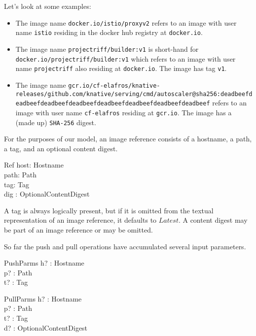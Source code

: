 \documentclass[a4paper,twoside,12pt]{article}
\begin{document}
Let's look at some examples:
\begin{itemize}
\item The image name \texttt{docker.io/istio/proxyv2} refers to an image with user name \texttt{istio} residing in the docker hub registry at \texttt{docker.io}.

\item The image name \texttt{projectriff/builder:v1} is short-hand for\linebreak
\texttt{docker.io/projectriff/builder:v1} which refers to an image with user name \texttt{projectriff} also residing at \texttt{docker.io}. The image has tag \texttt{v1}.

\item The image name \texttt{gcr.io/cf-elafros/knative-releases/github.com}\linebreak\texttt{/knative/serving/cmd/autoscaler@sha256:deadbeefdeadbeef}\linebreak\texttt{deadbeefdeadbeefdeadbeefdeadbeefdeadbeefdeadbeef} refers to an image with user name \texttt{cf-elafros} residing at \texttt{gcr.io}. The image has a (made up) \texttt{SHA-256} digest.
\end{itemize}

For the purposes of our model, an image reference consists of a hostname, a path, a tag, and an optional content digest.
\begin{schema}{Ref}
    host: Hostname \\
    path: Path \\
    tag: Tag \\
    dig : OptionalContentDigest \\
\end{schema}
A tag is always logically present, but if it is omitted from the textual representation of an image reference, it defaults to $Latest$.
A content digest may be part of an image reference or may be omitted.

So far the push and pull operations have accumulated several input parameters.
\begin{schema}{PushParms}
    h? : Hostname \\
    p? : Path \\
    t? : Tag \\
\end{schema}
\begin{schema}{PullParms}
    h? : Hostname \\
    p? : Path \\
    t? : Tag \\
    d? : OptionalContentDigest \\
\end{schema}
\end{document}
